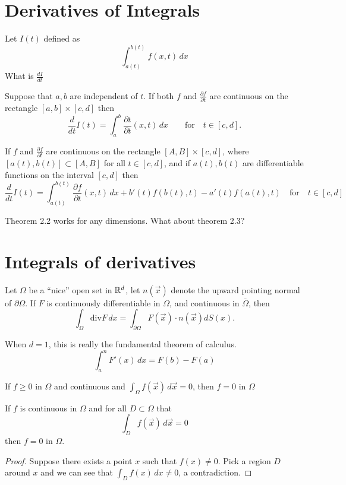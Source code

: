 \section{Derivatives of Integrals}
\begin{question}
	Let $I(t)$ defined as
	\[\int_{a(t)}^{b(t)} f(x,t)\, dx\]
	What is $\frac{dI}{dt}$
\end{question}
\begin{theorem}
	Suppose that $a,b$ are independent of $t$. If both $f$ and $\frac{\partial f}{\partial t}$ are continuous on the rectangle $[a,b] \times [c,d]$ then
	\[ \frac{d}{dt} I(t) = \int_a^b \frac{\partial t}{\partial t} (x,t)\,dx \qquad \mathrm{for} \quad t \in [c,d].\]
\end{theorem}
\begin{theorem}
	If $f$ and $\frac{\partial f}{\partial t}$ are continuous on the rectangle $[A, B] \times [c,d]$, where $[a(t),b(t)] \subset [A,B]$ for all $t \in [c,d]$, and if $a(t),b(t)$ are differentiable functions on the interval $[c,d]$ then
	\[ \frac{d}{dt} I(t) = \int_{a(t)}^{b(t)} \frac{\partial f}{\partial t} (x,t)\, dx + b'(t)f(b(t),t) - a'(t)f(a(t),t) \quad \mathrm{for} \quad t \in [c,d]\]
\end{theorem}
\begin{remark}
	Theorem 2.2 works for any dimensions. What about theorem 2.3?
\end{remark}
\section{Integrals of derivatives}
\begin{theorem}
	Let $\Omega$ be a ``nice'' open set in $\mathbb R^d$, let $n(\vec x)$ denote the upward pointing normal of $\partial \Omega$. If $F$ is continuously differentiable in $\Omega$, and continuous in $\bar \Omega$, then
	\[ \int_\Omega \mathrm{div} F \, dx = \int_{\partial \Omega} F(\vec x) \cdot n (\vec x) dS(x).\] 
\end{theorem}
\begin{remark}
	When $d = 1$, this is really the fundamental theorem of calculus.
	\[ \int_a^n F'(x)\,dx = F(b) - F(a)\]
\end{remark}
\begin{theorem}
	If $f \geq 0$ in $\Omega$ and continuous and $\int_\Omega f(\vec x)\,d\vec x = 0$, then $f = 0$ in $\Omega$
\end{theorem}
\begin{theorem}
	If $f$ is continuous in $\Omega$ and for all $D \subset \Omega$ that
	\[ \int_D f(\vec x)\, d\vec x = 0\]
	then $f = 0$ in $\Omega$.
\end{theorem}
\begin{proof}
	Suppose there exists a point $x$ such that $f(x) \neq 0$. Pick a region $D$ around $x$ and we can see that $\int_D f(x) \, dx \neq 0$, a contradiction.
\end{proof}